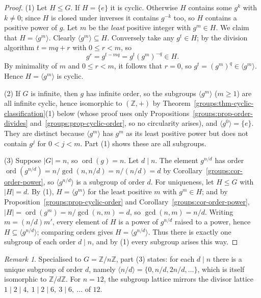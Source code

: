 \documentclass[11pt,a4paper]{article}
\theoremstyle{definition}
\theoremstyle{remark}
\newtheorem{remark}[theorem]{Remark}
\newcommand{\Z}{\ensuremath{\mathbb{Z}}}
\DeclareMathOperator{\ord}{ord}
\begin{document}
\begin{proof}
(1) Let \(H \le G\). If \(H = \{e\}\) it is cyclic. Otherwise \(H\) contains some \(g^k\) with \(k \neq 0\); since \(H\) is closed under inverses it contains \(g^{-k}\) too, so \(H\) contains a positive power of \(g\). Let \(m\) be the \emph{least} positive integer with \(g^m \in H\). We claim that \(H = \langle g^m\rangle\). Clearly \(\langle g^m\rangle \subseteq H\). Conversely take any \(g^t \in H\); by the division algorithm \(t = mq + r\) with \(0 \le r < m\), so
\[
g^r = g^{t - mq} = g^t (g^m)^{-q} \in H .
\]
By minimality of \(m\) and \(0 \le r < m\), it follows that \(r = 0\), so \(g^t = (g^m)^q \in \langle g^m\rangle\). Hence \(H = \langle g^m\rangle\) is cyclic.

(2) If \(G\) is infinite, then \(g\) has infinite order, so the subgroups \(\langle g^m\rangle\) (\(m \ge 1\)) are all infinite cyclic, hence isomorphic to \((\Z,+)\) by Theorem~\ref{groups:thm-cyclic-classification}(1) below (whose proof uses only Propositions~\ref{groups:prop-order-divides} and~\ref{groups:prop-cyclic-order}, so no circularity arises), and \(\langle g^0\rangle = \{e\}\). They are distinct because \(\langle g^m\rangle\) has \(g^m\) as its least positive power but does not contain \(g^j\) for \(0<j<m\). Part (1) shows these are all subgroups.

(3) Suppose \(|G| = n\), so \(\ord(g) = n\). Let \(d \mid n\). The element \(g^{n/d}\) has order \(\ord(g^{n/d}) = n/\gcd(n, n/d) = n/(n/d) = d\) by Corollary~\ref{groups:cor-order-power}, so \(\langle g^{n/d}\rangle\) is a subgroup of order \(d\). For uniqueness, let \(H \le G\) with \(|H| = d\). By (1), \(H = \langle g^m\rangle\) for the least positive \(m\) with \(g^m \in H\); and by Proposition~\ref{groups:prop-cyclic-order} and Corollary~\ref{groups:cor-order-power}, \(|H| = \ord(g^m) = n/\gcd(n,m) = d\), so \(\gcd(n,m) = n/d\). Writing \(m = (n/d) m'\), every element of \(H\) is a power of \(g^{n/d}\) raised to a power, hence \(H \subseteq \langle g^{n/d}\rangle\); comparing orders gives \(H = \langle g^{n/d}\rangle\). Thus there is exactly one subgroup of each order \(d \mid n\), and by (1) every subgroup arises this way.
\end{proof}

\begin{remark}\label{groups:rem-Zn-subgroups}
Specialised to \(G = \Z/n\Z\), part (3) states: for each \(d \mid n\) there is a unique subgroup of order \(d\), namely \(\langle n/d \rangle = \{0, n/d, 2n/d, \dots\}\), which is itself isomorphic to \(\Z/d\Z\). For \(n = 12\), the subgroup lattice mirrors the divisor lattice \(1 \mid 2 \mid 4,\ 1\mid 2 \mid 6,\ 3 \mid 6,\ \dots\) of \(12\).
\end{remark}
\end{document}

